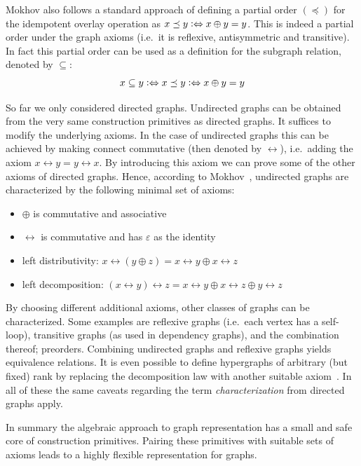 \documentclass{article}
\renewcommand{\epsilon}{\varepsilon}
\newcommand{\eps}{\epsilon}
\newcommand{\overlay}{\oplus}
\begin{document}
Mokhov also follows a standard approach of defining a partial order $(\preceq)$ for the
idempotent overlay operation as $x \preceq y \vcentcolon\Leftrightarrow x \overlay y = y$. This is indeed
a partial order under the graph axioms (i.e.\ it is reflexive, antisymmetric and
transitive). In fact this partial order can be used as a definition for
the subgraph relation, denoted by $\subseteq$:
\[
  x \subseteq y \vcentcolon\Leftrightarrow x \preceq y \vcentcolon\Leftrightarrow x \overlay y = y
\]

So far we only considered directed graphs. Undirected graphs can be
obtained from the very same construction primitives as directed graphs. It suffices
to modify the underlying axioms. In the case of undirected graphs this can be
achieved by making connect commutative (then denoted by $\leftrightarrow$),
i.e.\ adding the axiom $x \leftrightarrow y = y \leftrightarrow x$. By
introducing this axiom we can prove some of the other axioms of directed graphs.
Hence, according to Mokhov~\cite{mokhov2017algebraic}, undirected graphs are
characterized by the following minimal set of axioms:
\begin{itemize}
\item $\oplus$ is commutative and associative
\item $\leftrightarrow$ is commutative and has $\eps$ as the identity
\item left distributivity: $x \leftrightarrow (y \oplus z) = x \leftrightarrow
  y \oplus x \leftrightarrow z$
\item left decomposition: $(x \leftrightarrow y) \leftrightarrow z = x
  \leftrightarrow y \oplus x \leftrightarrow z \oplus y \leftrightarrow z$
\end{itemize}
By choosing different additional axioms, other classes of graphs can be
characterized. Some examples are reflexive graphs (i.e.\ each vertex has a
self-loop), transitive graphs (as used in dependency graphs), and the combination
thereof; preorders. Combining undirected graphs and reflexive graphs yields
equivalence relations. It is even possible to define hypergraphs of arbitrary
(but fixed) rank by replacing the decomposition law with another suitable
axiom~\cite{mokhov2017algebraic}. In all of these the same caveats regarding the
term \emph{characterization} from directed graphs apply.

In summary the algebraic approach to graph representation has a small and safe
core of construction primitives. Pairing these primitives with suitable sets of
axioms leads to a highly flexible representation for graphs.
\end{document}
